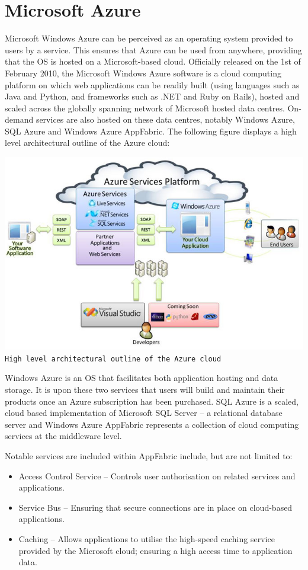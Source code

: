 \chapter{Microsoft Azure}
Microsoft Windows Azure can be perceived as an operating system provided to users by a service. This ensures that Azure can be used from anywhere, providing that the OS is hosted on a Microsoft-based cloud. Officially released on the 1st of February 2010, the Microsoft Windows Azure software is a cloud computing platform on which web applications can be readily built (using languages such as Java and Python, and frameworks such as .NET and Ruby on Rails), hosted and scaled across the globally spanning network of Microsoft hosted data centres. On-demand services are also hosted on these data centres, notably Windows Azure\ftAone\ftAoneText, SQL Azure and Windows Azure AppFabric. The following figure displays a high level architectural outline of the Azure cloud:

\begin{center}
\includegraphics[scale=0.8]{figs/Azure.png} \\
\texttt{High level architectural outline of the Azure cloud}\ftAimg\ftAimgText
\end{center}

Windows Azure is an OS that facilitates both application hosting and data storage. It is upon these two services that users will build and maintain their products once an Azure subscription has been purchased. SQL Azure is a scaled, cloud based implementation of Microsoft SQL Server -- a relational database server and Windows Azure AppFabric represents a collection of cloud computing services at the middleware level.

Notable services are included within AppFabric include, but are not limited to\ftAtwo\ftAtwoText:
\begin{itemize}
\item Access Control Service -- Controls user authorisation on related services and applications.
\item Service Bus -- Ensuring that secure connections are in place on cloud-based applications.
\item Caching -- Allows applications to utilise the high-speed caching service provided by the Microsoft cloud; ensuring a high access time to application data.
\end{itemize}

